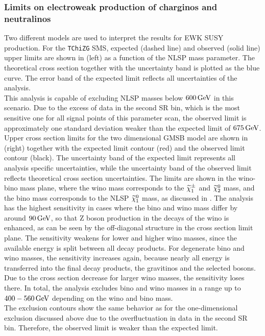 \subsubsection*{Limits on electroweak production of charginos and neutralinos}
Two different models are used to interpret the results for EWK SUSY production. For the \texttt{TChiZG} SMS, expected (dashed line) and observed (solid line) upper limits are shown in  (left) as a function of the NLSP mass parameter. The theoretical cross section together with the uncertainty band is plotted as the blue curve.
The error band of the expected limit reflects all uncertainties of the analysis.\\
This analysis is capable of excluding NLSP masses below $600\,\text{Ge\hspace{-.08em}V}$ in this scenario. Due to the excess of data in the second SR bin, which is the most sensitive one for all signal points of this parameter scan, the observed limit is approximately one standard deviation weaker than the expected limit of $675\,\text{Ge\hspace{-.08em}V}$.\\
Upper cross section limits for the two dimensional GMSB model are shown in  (right) together with the expected limit contour (red) and the observed limit contour (black). The uncertainty band of the expected limit represents all analysis specific uncertainties, while the uncertainty band of the observed limit reflects theoretical cross section uncertainties. The limits are shown in the wino-bino mass plane, where the wino mass corresponds to the $\widetilde{\chi}^\pm_{1}$ and $\widetilde{\chi}^{0}_{2}$ mass, and the bino mass corresponds to the NLSP $\widetilde{\chi}^{0}_{1}$ mass, as discussed in . The analysis has the highest sensitivity in cases where the bino and wino mass differ by around $90\,\text{Ge\hspace{-.08em}V}$, so that Z boson production in the decays of the wino is enhanced, as can be seen by the off-diagonal structure in the cross section limit plane. The sensitivity weakens for lower and higher wino masses, since the available energy is split between all decay products. For degenerate bino and wino masses, the sensitivity increases again, because nearly all energy is transferred into the final decay products, the gravitinos and the selected bosons. Due to the cross section decrease for larger wino masses, the sensitivity loses there. In total, the analysis excludes bino and wino masses in a range up to $400-560\,\text{Ge\hspace{-.08em}V}$ depending on the wino and bino mass.\\
The exclusion contours show the same behavior as for the one-dimensional exclusion discussed above due to the overfluctuation in data in the second SR bin. Therefore, the observed limit is weaker than the expected limit.
